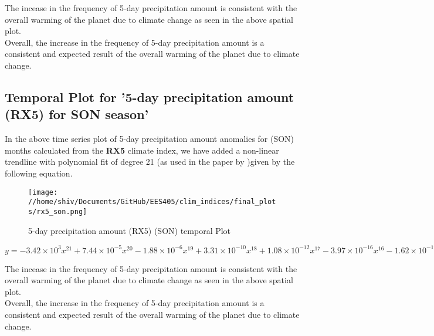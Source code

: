 \documentclass[a4paper, 12pt, twoside]{report}
\begin{document}
The incease in the frequency of 5-day precipitation amount is consistent with the overall warming of the planet due to climate change as seen in the above spatial plot.\\
Overall, the increase in the frequency of 5-day precipitation amount is a consistent and expected result of the overall warming of the planet due to climate change.



\subsection{Temporal Plot for '5-day precipitation amount (RX5) for SON season'}
In the above time series plot of 5-day precipitation amount anomalies for (SON) months calculated from the \textbf{RX5} climate index, we have added a non-linear trendline with polynomial fit of degree 21 (as used in the paper by )given by the following equation.
\begin{figure}[htb]
    \centering
    \texttt{[image: //home/shiv/Documents/GitHub/EES405/clim\_indices/final\_plots/rx5\_son.png]}
    \caption{5-day precipitation amount (RX5) (SON) temporal Plot}
    \label{fig:rx5_son_temporal}
\end{figure}

$ y = -3.42\times10^{3}x^{21}+7.44\times10^{-5}x^{20}-1.88\times10^{-6}x^{19}+3.31\times10^{-10}x^{18}+1.08\times10^{-12}x^{17}-3.97\times10^{-16}x^{16}-1.62\times10^{-19}x^{15}+1.05\times10^{-22}x^{14}-5.80\times10^{-27}x^{13}-8.00\times10^{-30}x^{12}+2.29\times10^{-33}x^{11}-1.20\times10^{-37}x^{10}-6.72\times10^{-41}x^{9}+1.99\times10^{-44}x^{8}-2.95\times10^{-48}x^{7}+2.85\times10^{-52}x^{6}-1.92\times10^{-56}x^{5}+9.12\times10^{-61}x^{4}-3.03\times10^{-65}x^{3}+6.69\times10^{-70}x^{2}-8.87\times10^{-75}x+5.34\times10^{-80}$

The incease in the frequency of 5-day precipitation amount is consistent with the overall warming of the planet due to climate change as seen in the above spatial plot.\\
Overall, the increase in the frequency of 5-day precipitation amount is a consistent and expected result of the overall warming of the planet due to climate change.
\end{document}
